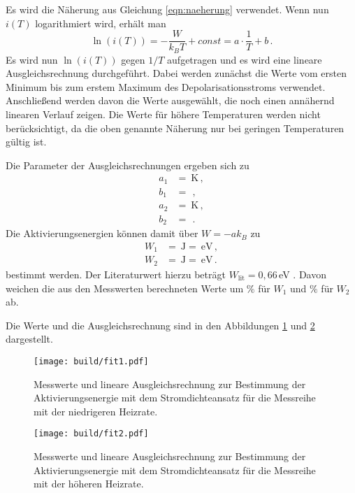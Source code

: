 Es wird die Näherung aus Gleichung \eqref{eqn:naeherung} verwendet. Wenn nun $i(T)$
logarithmiert wird, erhält man
\begin{equation*}
  \ln(i(T))=-\frac{W}{k_B T} + const =a\cdot \frac{1}{T} +b  \,.
\end{equation*}
\cite{Wie lösen wir hier das Problem mit der Einheit im ln?}
Es wird nun $\ln(i(T))$ gegen $1/T$ aufgetragen und es wird eine lineare Ausgleichsrechnung
durchgeführt. Dabei werden zunächst die Werte vom ersten Minimum bis zum erstem Maximum
des Depolarisationsstroms verwendet. Anschließend werden davon die Werte ausgewählt, die
noch einen annähernd linearen Verlauf zeigen. Die Werte für höhere Temperaturen werden
nicht berücksichtigt, da die oben genannte Näherung nur bei geringen
Temperaturen gültig ist.

Die Parameter
der Ausgleichsrechnungen ergeben sich zu
\begin{align*}
  a_1&=\SI{}{\kelvin} \,, \\
  b_1&=\SI{}{}  \,, \\
  a_2&=\SI{}{\kelvin} \,, \\
  b_2&=\SI{}{}  \,.
\end{align*}
Die Aktivierungsenergien können damit über $W=-ak_B$ zu
\begin{align*}
 W_1&=\SI{}{\joule}= \SI{}{\eV}  \,, \\
 W_2&=\SI{}{\joule}=\SI{}{\eV} \,.
\end{align*}
bestimmt werden. Der Literaturwert hierzu beträgt $W_{\text{lit}}=0{,}66\,$eV \cite{lit}. Davon weichen
die aus den Messwerten berechneten Werte um $\%$ für $W_1$ und $\%$ für
$W_2$ ab.

Die Werte und die Ausgleichsrechnung sind in den Abbildungen \ref{fig:fit1} und
\ref{fig:fit2} dargestellt.

\begin{figure}
  \centering
  \texttt{[image: build/fit1.pdf]}
  \caption{Messwerte und lineare Ausgleichsrechnung zur Bestimmung der Aktivierungsenergie mit dem Stromdichteansatz für
  die Messreihe mit der niedrigeren Heizrate.}
  \label{fig:fit1}
\end{figure}
\begin{figure}
  \centering
  \texttt{[image: build/fit2.pdf]}
  \caption{Messwerte und lineare Ausgleichsrechnung zur Bestimmung der Aktivierungsenergie mit dem Stromdichteansatz für
  die Messreihe mit der höheren Heizrate.}
  \label{fig:fit2}
\end{figure}

